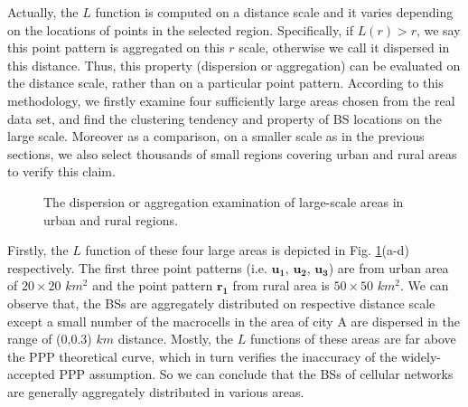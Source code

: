 Actually, the $L$ function is computed on a distance scale and it varies depending on the locations of points in the selected region. Specifically, if $L(r)>r$, we say this point pattern is aggregated on this $r$ scale, otherwise we call it dispersed in this distance. Thus, this property (dispersion or aggregation) can be evaluated on the distance scale, rather than on a particular point pattern. According to this methodology, we firstly examine four sufficiently large areas chosen from the real data set, and find the clustering tendency and property of BS locations on the large scale. Moreover as a comparison, on a smaller scale as in the previous sections, we also select thousands of small regions covering urban and rural areas to verify this claim.

\begin{figure} [!htb]
\centering
 \hspace{1in}
\caption{The dispersion or aggregation examination of large-scale areas in urban and rural regions.}
\label{l_large}
\end{figure}

Firstly, the $L$ function of these four large areas is depicted in Fig. \ref{l_large}(a-d) respectively. The first three point patterns (i.e. $\mathbf{u_1}$, $\mathbf{u_2}$, $\mathbf{u_3}$) are from urban area of $20\times20$ $km^2$ and the point pattern $\mathbf{r_1}$ from rural area is $50\times50$ $km^2$. We can observe that, the BSs are aggregately distributed on respective distance scale except a small number of the macrocells in the area of city A are dispersed in the range of (0,0.3) $km$ distance. Mostly, the $L$ functions of these areas are far above the PPP theoretical curve, which in turn verifies the inaccuracy of the widely-accepted PPP assumption. So we can conclude that the BSs of cellular networks are generally aggregately distributed in various areas.

